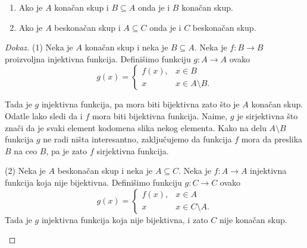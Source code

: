 \begin{THM}
  \begin{enumerate}
  \item Ako je $A$ kona\v can skup i $B \subseteq A$ onda je i $B$ kona\v can skup.
  \item Ako je $A$ beskona\v can skup i $A \subseteq C$ onda je i $C$ beskona\v can skup.
  \end{enumerate}
\end{THM}
\begin{proof}[Dokaz]
  (1)
  Neka je $A$ kona\v can skup i neka je $B \subseteq A$. Neka je $f : B \to B$ proizvoljna injektivna funkcija.
  Defini\v simo funkciju $g : A \to A$ ovako
  $$
    g(x) = \begin{cases}
      f(x), & x \in B\\
      x     & x \in A \setminus B.
    \end{cases}
  $$

\noindent
\begin{minipage}{3in}
  Tada je $g$ injektivna funkcija, pa mora biti bijektivna zato \v sto je $A$ kona\v can skup.
  Odatle lako sledi da i $f$ mora biti bijektivna funkcija. Naime, $g$ je sirjektivna \v sto zna\v ci
  da je svaki element kodomena slika nekog elementa. Kako na delu $A \setminus B$ funkcija $g$ ne radi
  ni\v sta interesantno, zaklju\v cujemo da funkcija $f$ mora da preslika $B$ na ceo $B$, pa je zato $f$ sirjektivna
  funkcija.
\end{minipage}
\hfill
\begin{minipage}{2.5in}
  \begin{center}
    
  \end{center}
\end{minipage}

\medskip

\noindent
\begin{minipage}{3in}
  \hspace*{1.5em}(2)
  Neka je $A$ beskona\v can skup i neka je $A \subseteq C$. Neka je $f : A \to A$ injektivna funkcija koja nije bijektivna.
  Defini\v simo funkciju $g : C \to C$ ovako
  $$
    g(x) = \begin{cases}
      f(x), & x \in A\\
      x     & x \in C \setminus A.
    \end{cases}
  $$
  Tada je $g$ injektivna funkcija koja nije bijektivna, i zato $C$ nije kona\v can skup.\qedhere
\end{minipage}
\hfill
\begin{minipage}{2.5in}
  \begin{center}
    
  \end{center}
\end{minipage}
\end{proof}

